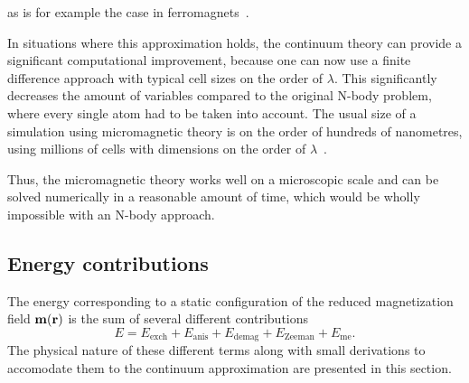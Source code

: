 \documentclass[11pt,a4paper,english,twoside]{article}
\begin{document}
as is for example the case in ferromagnets~\cite{abert2013discrete}. \par
In situations where this approximation holds, the continuum theory can provide a significant computational improvement, because one can now use a finite difference approach with typical cell sizes on the order of $\lambda$. This significantly decreases the amount of variables compared to the original N-body problem, where every single atom had to be taken into account. The usual size of a simulation using micromagnetic theory is on the order of hundreds of nanometres, using millions of cells with dimensions on the order of $\lambda$~\cite{abert2013discrete}. \par
Thus, the micromagnetic theory works well on a microscopic scale and can be solved numerically in a reasonable amount of time, which would be wholly impossible with an N-body approach.

\subsection{Energy contributions}
The energy corresponding to a static configuration of the reduced magnetization field $\vb{m}(\vb{r})$ is the sum of several different contributions
\begin{equation}
    E = E_\mathrm{exch} + E_\mathrm{anis} + E_\mathrm{demag} + E_\mathrm{Zeeman} + E_\mathrm{me} \mathrm{.} \label{eq:Energy_Terms}
\end{equation}
The physical nature of these different terms along with small derivations to accomodate them to the continuum approximation are presented in this section.
\end{document}

